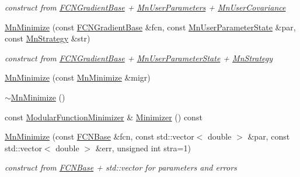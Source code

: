 \begin{DoxyCompactItemize}
\begin{DoxyCompactList}\small\item\em construct from \mbox{\hyperlink{classROOT_1_1Minuit2_1_1FCNGradientBase}{F\+C\+N\+Gradient\+Base}} + \mbox{\hyperlink{classROOT_1_1Minuit2_1_1MnUserParameters}{Mn\+User\+Parameters}} + \mbox{\hyperlink{classROOT_1_1Minuit2_1_1MnUserCovariance}{Mn\+User\+Covariance}} \end{DoxyCompactList}\item 
\mbox{\hyperlink{classROOT_1_1Minuit2_1_1MnMinimize_ae607cd588cff70b64c0705bb86a36ba0}{Mn\+Minimize}} (const \mbox{\hyperlink{classROOT_1_1Minuit2_1_1FCNGradientBase}{F\+C\+N\+Gradient\+Base}} \&fcn, const \mbox{\hyperlink{classROOT_1_1Minuit2_1_1MnUserParameterState}{Mn\+User\+Parameter\+State}} \&par, const \mbox{\hyperlink{classROOT_1_1Minuit2_1_1MnStrategy}{Mn\+Strategy}} \&str)
\begin{DoxyCompactList}\small\item\em construct from \mbox{\hyperlink{classROOT_1_1Minuit2_1_1FCNGradientBase}{F\+C\+N\+Gradient\+Base}} + \mbox{\hyperlink{classROOT_1_1Minuit2_1_1MnUserParameterState}{Mn\+User\+Parameter\+State}} + \mbox{\hyperlink{classROOT_1_1Minuit2_1_1MnStrategy}{Mn\+Strategy}} \end{DoxyCompactList}\item 
\mbox{\hyperlink{classROOT_1_1Minuit2_1_1MnMinimize_a5381e16cfd79c2b4da61e399a6a02b35}{Mn\+Minimize}} (const \mbox{\hyperlink{classROOT_1_1Minuit2_1_1MnMinimize}{Mn\+Minimize}} \&migr)
\item 
\mbox{\hyperlink{classROOT_1_1Minuit2_1_1MnMinimize_ae4544af29d79b1415179ce48c05b9ae0}{$\sim$\+Mn\+Minimize}} ()
\item 
const \mbox{\hyperlink{classROOT_1_1Minuit2_1_1ModularFunctionMinimizer}{Modular\+Function\+Minimizer}} \& \mbox{\hyperlink{classROOT_1_1Minuit2_1_1MnMinimize_a879bb789f98c72f9a90a327fc7bb48fd}{Minimizer}} () const
\item 
\mbox{\hyperlink{classROOT_1_1Minuit2_1_1MnMinimize_ab556cdc37be07557d060aa179a7e0d1f}{Mn\+Minimize}} (const \mbox{\hyperlink{classROOT_1_1Minuit2_1_1FCNBase}{F\+C\+N\+Base}} \&fcn, const std\+::vector$<$ double $>$ \&par, const std\+::vector$<$ double $>$ \&err, unsigned int stra=1)
\begin{DoxyCompactList}\small\item\em construct from \mbox{\hyperlink{classROOT_1_1Minuit2_1_1FCNBase}{F\+C\+N\+Base}} + std\+::vector for parameters and errors \end{DoxyCompactList}\item 

\end{DoxyCompactItemize}

